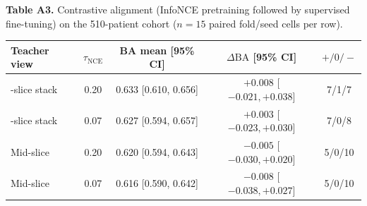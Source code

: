 \documentclass[pdflatex,sn-vancouver,Numbered]{sn-jnl}
\begin{document}
\begin{minipage}{\textwidth}
{\small\noindent\textbf{Table A3.} Contrastive alignment (InfoNCE pretraining followed by supervised fine-tuning) on the 510-patient cohort ($n=15$ paired fold/seed cells per row).\par}
\vspace{6pt}


\centering
\scriptsize
\setlength{\tabcolsep}{3pt}
\renewcommand{\arraystretch}{0.9}
\begin{tabularx}{\columnwidth}{@{}>{\raggedright\arraybackslash}Xcccc@{}}
\toprule
Teacher view & $\tau_{\mathrm{NCE}}$ & BA mean [95\% CI] & $\Delta\mathrm{BA}$ [95\% CI] & $+/0/-$ \\
\midrule
3-slice stack & 0.20 & 0.633 [0.610, 0.656] & $+0.008$ [$-0.021,+0.038$] & 7/1/7 \\
3-slice stack & 0.07 & 0.627 [0.594, 0.657] & $+0.003$ [$-0.023,+0.030$] & 7/0/8 \\
Mid-slice     & 0.20 & 0.620 [0.594, 0.643] & $-0.005$ [$-0.030,+0.020$] & 5/0/10 \\
Mid-slice     & 0.07 & 0.616 [0.590, 0.642] & $-0.008$ [$-0.038,+0.027$] & 5/0/10 \\
\bottomrule
\end{tabularx}
\end{minipage}
\clearpage
\end{document}
